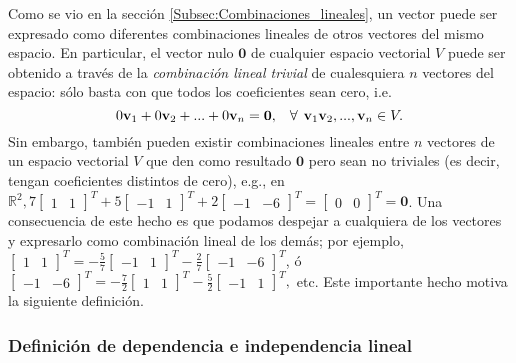 \documentclass[12pt]{article}
\begin{document}
Como se vio en la sección \ref{Subsec:Combinaciones_lineales}, un vector puede ser expresado como diferentes combinaciones lineales de otros vectores del mismo espacio. En particular, el vector nulo $\mathbf{0}$ de cualquier espacio vectorial $V$ puede ser obtenido a través de la \emph{combinación lineal trivial} de cualesquiera $n$ vectores del espacio: sólo basta con que todos los coeficientes sean cero, i.e. $$0\mathbf{v}_1+0\mathbf{v}_2+...+0\mathbf{v}_n=\mathbf{0}, \hspace{3mm}\forall\hspace{1.5mm}\mathbf{v}_1 \mathbf{v}_2, ...,\mathbf{v}_n \in V.$$ Sin embargo, también pueden existir combinaciones lineales entre $n$ vectores de un espacio vectorial $V$ que den como resultado $\mathbf{0}$ pero sean no triviales (es decir, tengan coeficientes distintos de cero), e.g., en $\mathbb{R}^2, 7\begin{bmatrix} 1 & 1 \end{bmatrix}^T+5\begin{bmatrix} -1 & 1 \end{bmatrix}^T+2\begin{bmatrix} -1 & -6 \end{bmatrix}^T=\begin{bmatrix} 0 & 0 \end{bmatrix}^T=\mathbf{0}$. Una consecuencia de este hecho es que podamos despejar a cualquiera de los vectores y expresarlo como combinación lineal de los demás; por ejemplo, $\begin{bmatrix} 1 & 1 \end{bmatrix}^T=-\frac{5}{7}\begin{bmatrix} -1 & 1 \end{bmatrix}^T-\frac{2}{7}\begin{bmatrix} -1 & -6 \end{bmatrix}^T$, ó $\begin{bmatrix} -1 & -6 \end{bmatrix}^T = -\frac{7}{2}\begin{bmatrix} 1 & 1 \end{bmatrix}^T-\frac{5}{2}\begin{bmatrix} -1 & 1 \end{bmatrix}^T,$ etc. Este importante hecho motiva la siguiente definición.

\subsubsection{Definición de dependencia e independencia lineal} \label{Def:Dependencia_e_independencia_lineal}
\end{document}
